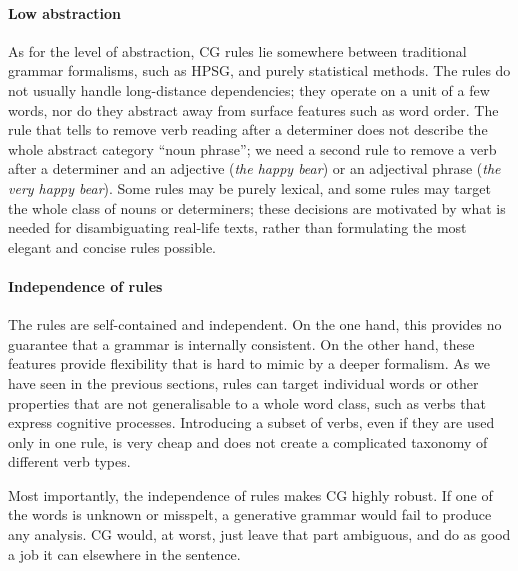 \paragraph{Low abstraction} 

As for the level of abstraction, CG rules lie somewhere between 
traditional grammar formalisms, such as HPSG, and purely statistical methods.
The rules do not usually handle long-distance dependencies; 
they operate on a unit of a few words, nor do they abstract away from surface features such as word order.
The rule that tells to remove verb reading after a determiner
does not describe the whole abstract category ``noun phrase''; we need a second
rule to remove a verb after a determiner and an adjective (\emph{the happy bear}) 
or an adjectival phrase (\emph{the very happy bear}).
Some rules may be purely lexical, and some rules may target the whole class of nouns or determiners; these decisions are motivated by what is needed for disambiguating real-life texts, rather than formulating the most elegant and concise rules possible.



\paragraph{Independence of rules}
The rules are self-contained and independent.
On the one hand, this provides no guarantee that a grammar is internally consistent.
On the other hand, these features provide flexibility that is hard to mimic by a deeper formalism.
As we have seen in the previous sections, rules can target individual words
or other properties that are not generalisable to a whole word class,
such as verbs that express cognitive processes.
Introducing a subset of verbs, even if they are used only in one rule,
is very cheap and does not create a complicated taxonomy of different verb types.

Most importantly, the independence of rules makes CG highly robust.
If one of the words is unknown or misspelt, a generative grammar would fail to produce any analysis. 
CG would, at worst, just leave that part ambiguous, and do as good a job it can elsewhere in the sentence.



